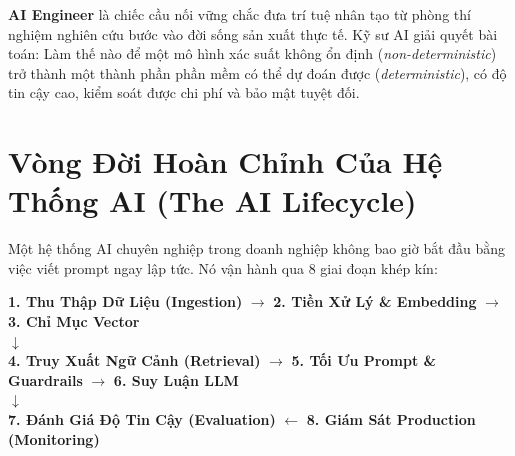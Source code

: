 \begin{definitionbox}
\textbf{AI Engineer} là chiếc cầu nối vững chắc đưa trí tuệ nhân tạo từ phòng thí nghiệm nghiên cứu bước vào đời sống sản xuất thực tế. Kỹ sư AI giải quyết bài toán: Làm thế nào để một mô hình xác suất không ổn định (\textit{non-deterministic}) trở thành một thành phần phần mềm có thể dự đoán được (\textit{deterministic}), có độ tin cậy cao, kiểm soát được chi phí và bảo mật tuyệt đối.
\end{definitionbox}

\section{Vòng Đời Hoàn Chỉnh Của Hệ Thống AI (The AI Lifecycle)}
\label{sec:p0-lifecycle}

Một hệ thống AI chuyên nghiệp trong doanh nghiệp không bao giờ bắt đầu bằng việc viết prompt ngay lập tức. Nó vận hành qua 8 giai đoạn khép kín:

\begin{center}
\textbf{1. Thu Thập Dữ Liệu (Ingestion)} $\longrightarrow$ \textbf{2. Tiền Xử Lý \& Embedding} $\longrightarrow$ \textbf{3. Chỉ Mục Vector}\\
$\downarrow$\\
\textbf{4. Truy Xuất Ngữ Cảnh (Retrieval)} $\longrightarrow$ \textbf{5. Tối Ưu Prompt \& Guardrails} $\longrightarrow$ \textbf{6. Suy Luận LLM}\\
$\downarrow$\\
\textbf{7. Đánh Giá Độ Tin Cậy (Evaluation)} $\longleftarrow$ \textbf{8. Giám Sát Production (Monitoring)}
\end{center}

